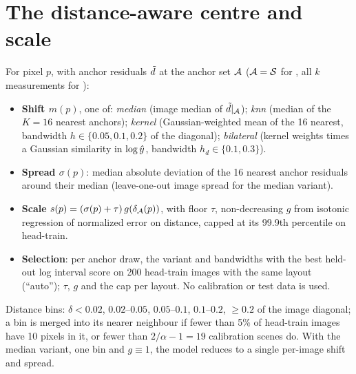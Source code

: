 \documentclass[10pt,twocolumn,letterpaper]{article}
\begin{document}
\section{The distance-aware centre and scale}
\label{supp:adist}
For pixel $p$, with anchor residuals $\tilde{d}$ at the anchor set $\mathcal{A}$ ($\mathcal{A}=\mathcal{S}$ for \mDual, all $k$ measurements for \mDistSplit):
\begin{itemize}[leftmargin=*,itemsep=1pt]
\item \textbf{Shift $m(p)$}, one of: \emph{median} (image median of $\tilde{d}|_{\mathcal{A}}$); \emph{knn} (median of the $K=16$ nearest anchors); \emph{kernel} (Gaussian-weighted mean of the 16 nearest, bandwidth $h\in\{0.05,0.1,0.2\}$ of the diagonal); \emph{bilateral} (kernel weights times a Gaussian similarity in $\log\hat{y}$, bandwidth $h_d\in\{0.1,0.3\}$).
\item \textbf{Spread $\sigma(p)$}: median absolute deviation of the 16 nearest anchor residuals around their median (leave-one-out image spread for the median variant).
\item \textbf{Scale} $s(p)=(\sigma(p)+\tau)\,g(\delta_{\mathcal{A}}(p))$, with floor $\tau$, non-decreasing $g$ from isotonic regression of normalized error on distance, capped at its 99.9th percentile on head-train.
\item \textbf{Selection}: per anchor draw, the variant and bandwidths with the best held-out log interval score on 200 head-train images with the same layout (``auto''); $\tau$, $g$ and the cap per layout. No calibration or test data is used.
\end{itemize}
Distance bins: $\delta<0.02$, $0.02$--$0.05$, $0.05$--$0.1$, $0.1$--$0.2$, $\ge0.2$ of the image diagonal; a bin is merged into its nearer neighbour if fewer than 5\% of head-train images have 10 pixels in it, or fewer than $2/\alpha-1=19$ calibration scenes do. With the median variant, one bin and $g\equiv1$, the model reduces to a single per-image shift and spread.
\end{document}
